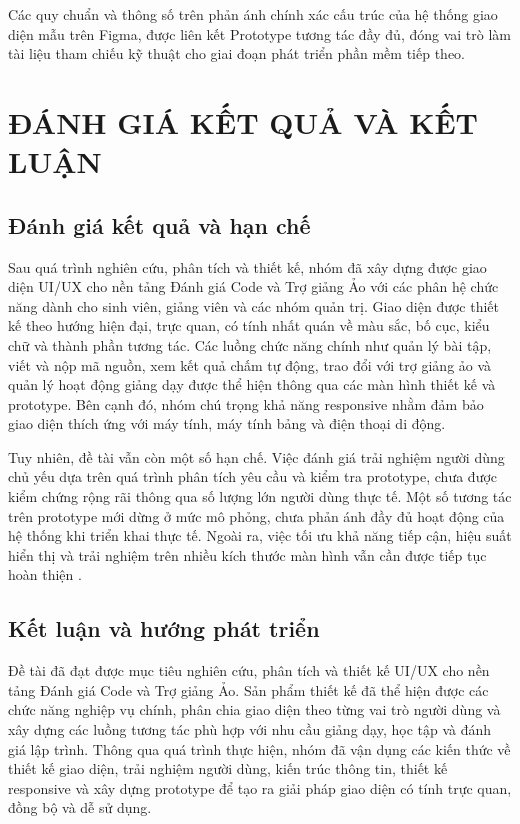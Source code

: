 \documentclass[12pt,a4paper,oneside]{report}
\begin{document}
Các quy chuẩn và thông số trên phản ánh chính xác cấu trúc của hệ thống giao diện mẫu trên Figma, được liên kết Prototype tương tác đầy đủ, đóng vai trò làm tài liệu tham chiếu kỹ thuật cho giai đoạn phát triển phần mềm tiếp theo.

\newpage

\chapter{ĐÁNH GIÁ KẾT QUẢ VÀ KẾT LUẬN}

\section{Đánh giá kết quả và hạn chế}

Sau quá trình nghiên cứu, phân tích và thiết kế, nhóm đã xây dựng được giao diện UI/UX cho nền tảng Đánh giá Code và Trợ giảng Ảo với các phân hệ chức năng dành cho sinh viên, giảng viên và các nhóm quản trị. Giao diện được thiết kế theo hướng hiện đại, trực quan, có tính nhất quán về màu sắc, bố cục, kiểu chữ và thành phần tương tác. Các luồng chức năng chính như quản lý bài tập, viết và nộp mã nguồn, xem kết quả chấm tự động, trao đổi với trợ giảng ảo và quản lý hoạt động giảng dạy được thể hiện thông qua các màn hình thiết kế và prototype. Bên cạnh đó, nhóm chú trọng khả năng responsive nhằm đảm bảo giao diện thích ứng với máy tính, máy tính bảng và điện thoại di động.

Tuy nhiên, đề tài vẫn còn một số hạn chế. Việc đánh giá trải nghiệm người dùng chủ yếu dựa trên quá trình phân tích yêu cầu và kiểm tra prototype, chưa được kiểm chứng rộng rãi thông qua số lượng lớn người dùng thực tế. Một số tương tác trên prototype mới dừng ở mức mô phỏng, chưa phản ánh đầy đủ hoạt động của hệ thống khi triển khai thực tế. Ngoài ra, việc tối ưu khả năng tiếp cận, hiệu suất hiển thị và trải nghiệm trên nhiều kích thước màn hình vẫn cần được tiếp tục hoàn thiện \cite{nielsen1994, wcag22}.

\section{Kết luận và hướng phát triển}

Đề tài đã đạt được mục tiêu nghiên cứu, phân tích và thiết kế UI/UX cho nền tảng Đánh giá Code và Trợ giảng Ảo. Sản phẩm thiết kế đã thể hiện được các chức năng nghiệp vụ chính, phân chia giao diện theo từng vai trò người dùng và xây dựng các luồng tương tác phù hợp với nhu cầu giảng dạy, học tập và đánh giá lập trình. Thông qua quá trình thực hiện, nhóm đã vận dụng các kiến thức về thiết kế giao diện, trải nghiệm người dùng, kiến trúc thông tin, thiết kế responsive và xây dựng prototype để tạo ra giải pháp giao diện có tính trực quan, đồng bộ và dễ sử dụng.
\end{document}
